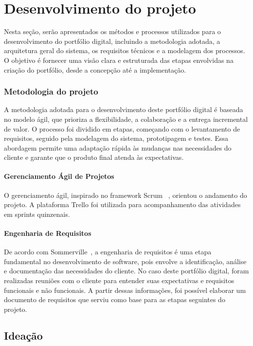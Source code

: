 \chapter{Desenvolvimento do projeto}
\label{chap:metod}
 Nesta seção, serão apresentados os métodos e processos utilizados para o desenvolvimento do portfólio digital, incluindo a metodologia adotada, a arquitetura geral do sistema, os requisitos técnicos e a modelagem dos processos. O objetivo é fornecer uma visão clara e estruturada das etapas envolvidas na criação do portfólio, desde a concepção até a implementação.

\subsection{Metodologia do projeto}
    A metodologia adotada para o desenvolvimento deste portfólio digital é baseada no modelo ágil, que prioriza a flexibilidade, a colaboração e a entrega incremental de valor. O processo foi dividido em etapas, começando com o levantamento de requisitos, seguido pela modelagem do sistema, prototipagem e testes. Essa abordagem permite uma adaptação rápida às mudanças nas necessidades do cliente e garante que o produto final atenda às expectativas.

\subsubsection{Gerenciamento Ágil de Projetos}
O gerenciamento ágil, inspirado no framework Scrum~ \cite{schwaber2001agile}, orientou o andamento do projeto. A plataforma Trello foi utilizada para acompanhamento das atividades em sprints quinzenais.

\subsubsection{Engenharia de Requisitos}

 De acordo com Sommerville~\cite{kotonya1998requirements}, a engenharia de requisitos é uma etapa fundamental no desenvolvimento de software, pois envolve a identificação, análise e documentação das necessidades do cliente. No caso deste portfólio digital, foram realizadas reuniões com o cliente para entender suas expectativas e requisitos funcionais e não funcionais. A partir dessas informações, foi possível elaborar um documento de requisitos que serviu como base para as etapas seguintes do projeto.

\section{Ideação}

